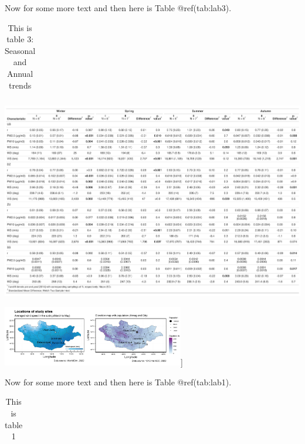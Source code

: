 \documentclass[
  11pt,
]{article}
\begin{document}
\begin{landscape}

Now for some more text and then here is Table @ref(tab:lab3).

\begin{table}[ht]
\centering
\begingroup\fontsize{0.1pt}{0.1pt}\selectfont
\begin{tabular}{r}
   \\ 
 \end{tabular}
\endgroup
\caption{This is table 3: Seasonal and Annual
trends} 
\label{tab:lab3}
\end{table}

\begin{center}\includegraphics[width=8in]{images/tbl3_pre_post_2014} \end{center}
\end{landscape}

\newpage

\includegraphics[width=3.125in,height=\textheight,keepaspectratio]{images/figure_1.png}{]}

Now for some more text and then here is Table @ref(tab:lab1).

\begin{table}[ht]
\centering
\begingroup\fontsize{0.1pt}{0.1pt}\selectfont
\begin{tabular}{r}
   \\ 
 \end{tabular}
\endgroup
\caption{This is table 1} 
\label{tab:lab1}
\end{table}
\end{document}
